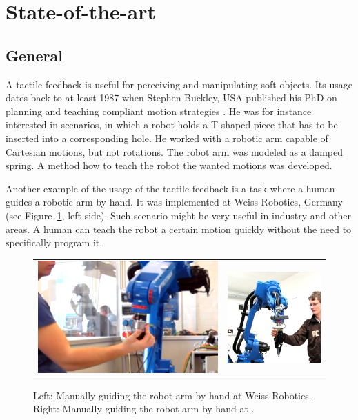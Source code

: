 \graphicspath{{Img/SOTA/}}

\section{State-of-the-art}

    \subsection{General}
A tactile feedback is useful for perceiving and manipulating soft objects. Its usage dates back to at least 1987 when Stephen Buckley, USA published his PhD on planning and teaching compliant motion strategies \cite{Buckley1987Insertion}. He was for instance interested in scenarios, in which a robot holds a T-shaped piece that has to be inserted into a corresponding hole. He worked with a robotic arm capable of Cartesian motions, but not rotations. The robot arm was modeled as a damped spring. A method how to teach the robot the wanted motions was developed.

Another example of the usage of the tactile feedback is a task where a human guides a robotic arm by hand. It was implemented at Weiss Robotics, Germany \cite{Weissrobotics} (see Figure~\ref{fig:CompliantMotion}, left side). Such scenario might be very useful in industry and other areas. A human can teach the robot a certain motion quickly without the need to specifically program it.

        \begin{figure}[h]
            \centering
            \begin{tabular}{cc}
            \includegraphics[height=0.3\textwidth]{WeissRobotics.png}
            &
            \includegraphics[height=0.3\textwidth]{CompliantMotion.png}
            \end{tabular}
            \caption{Left: Manually guiding the robot arm by hand at Weiss Robotics. Right: Manually guiding the robot arm by hand at \CloPeMa\/.}
            \label{fig:CompliantMotion}
        \end{figure}

